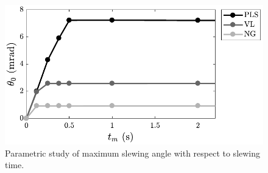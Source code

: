 \begin{figure}[t]
\centering
\includegraphics[width=0.6\columnwidth]{../ch7/figures/maxslew_parametric.pdf}
\caption{Parametric study of maximum slewing angle with respect to slewing time.}\label{fig:ch7:maxslew_parametric}
\end{figure}